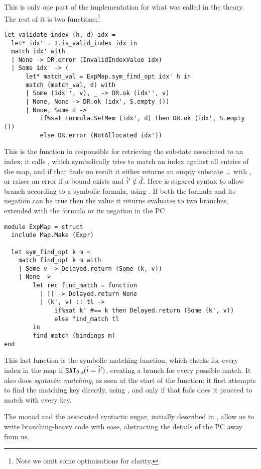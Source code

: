 This is only one part of the implementation for what was called  in the theory. The rest of it is two functions:\footnote{Note we omit some optimisations for clarity.} \begin{lstlisting}
let validate_index (h, d) idx =
  let* idx' = I.is_valid_index idx in
  match idx' with
  | None -> DR.error (InvalidIndexValue idx)
  | Some idx' -> (
      let* match_val = ExpMap.sym_find_opt idx' h in
      match (match_val, d) with
      | Some (idx'', v), _ -> DR.ok (idx'', v)
      | None, None -> DR.ok (idx', S.empty ())
      | None, Some d ->
          if%sat Formula.SetMem (idx', d) then DR.ok (idx', S.empty ())
          else DR.error (NotAllocated idx'))
\end{lstlisting}
This is the function in \PMap{} responsible for retrieving the substate associated to an index; it calls , which symbolically tries to match an index against all entries of the map, and if that finds no result it either returns an empty substate $\bot$ with , or raises an error if a bound exists and $\hat{i}'\notin \hat{d}$. Here  is sugared syntax to allow branch according to a symbolic formula, using . If both the formula and its negation can be true then the value it returns evaluates to two branches, extended with the formula or its negation in the PC.
\begin{lstlisting}
module ExpMap = struct
  include Map.Make (Expr)
  
  let sym_find_opt k m =
    match find_opt k m with
    | Some v -> Delayed.return (Some (k, v))
    | None ->
        let rec find_match = function
          | [] -> Delayed.return None
          | (k', v) :: tl ->
              if%sat k' #== k then Delayed.return (Some (k', v))
              else find_match tl
        in
        find_match (bindings m)
end
\end{lstlisting}
This last function is the symbolic matching function, which checks for every index in the map if $\texttt{SAT}_{\mathit{\theta,s}}(\hat{i} = \hat{i}')$, creating a branch for every possible match. It also does \emph{syntactic matching}, as seen at the start of the function: it first attempts to find the matching key directly, using , and only if that fails does it proceed to match with every key.

The  monad and the associated syntactic sugar, initially described in \cite{sacha-phd}, allow us to write branching-heavy code with ease, abstracting the details of the PC away from us.

